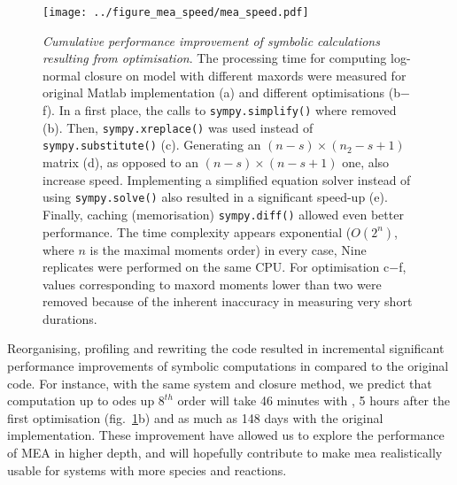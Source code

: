 \begin{figure}[tbh]

\texttt{[image: ../figure\_mea\_speed/mea\_speed.pdf]}
\caption{\emph{Cumulative performance improvement of symbolic 
calculations resulting from optimisation}.
The processing time for computing log-normal closure on \pft{} model with different \gls{maxord}s were measured for original Matlab implementation (a) and different optimisations (b$-$f).
In a first place, the calls to \texttt{sympy.simplify()} where removed (b). 
Then, \texttt{sympy.xreplace()} was used instead of \texttt{sympy.substitute()} (c). 
Generating an $(n-s) \times (n_2-s + 1)$ matrix (d), as opposed to an $(n-s) \times (n-s + 1)$ one, also increase speed.
Implementing a simplified equation solver instead of using \texttt{sympy.solve()} also resulted in a significant speed-up (e). 
Finally, caching (memorisation) \texttt{sympy.diff()} allowed even better performance.
The time complexity appears exponential ($O(2^n)$, where $n$ is the maximal moments order) in every case, 
Nine replicates were performed on the same CPU. 
For optimisation c$-$f, values corresponding to \gls{maxord} moments lower than two were removed because of the inherent inaccuracy in measuring very short durations.
}
\label{fig:mea_speed}
\end{figure}


Reorganising, profiling and rewriting the code resulted in incremental significant performance improvements of symbolic computations in \means{} compared to the original \mat{} code.
For instance, with the same \pft{} system and closure method, 
we predict that computation up to \gls{ode}s up $8^{th}$ order will take 46 minutes with \means{}, 5 hours after the first optimisation (fig.~\ref{fig:mea_speed}b) and as much as 148 days with the original implementation.
These improvement have allowed us to explore the performance of MEA in higher depth, and will hopefully contribute to make \gls{mea} realistically usable for systems with more species and reactions.

